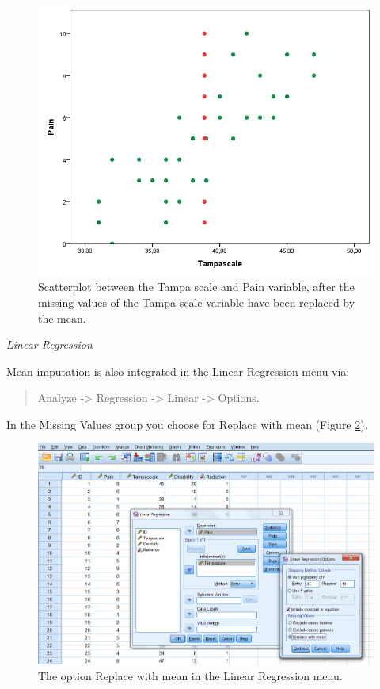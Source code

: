 \documentclass[
]{book}
\begin{document}
\begin{figure}

{\centering \includegraphics[width=0.7\linewidth]{images/fig3.4} 

}

\caption{Scatterplot between the Tampa scale and Pain variable, after the missing values of the Tampa scale variable have been replaced by the mean.}\label{fig:fig3-4}
\end{figure}

\emph{Linear Regression}

Mean imputation is also integrated in the Linear Regression menu via:

\begin{quote}
Analyze -\textgreater{} Regression -\textgreater{} Linear -\textgreater{} Options.
\end{quote}

In the Missing Values group you choose for Replace with mean (Figure \ref{fig:fig3-8}).

\begin{figure}

{\centering \includegraphics[width=0.7\linewidth]{images/fig3.8} 

}

\caption{The option Replace with mean in the Linear Regression menu.}\label{fig:fig3-8}
\end{figure}
\end{document}
